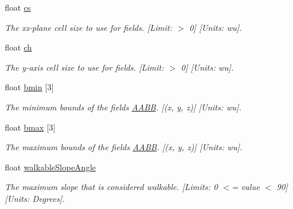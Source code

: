 \begin{DoxyCompactItemize}
\mbox{\label{structrcConfig_a5e970c105687d1083c9e7de2c27a2907}} 
float \hyperlink{structrcConfig_a5e970c105687d1083c9e7de2c27a2907}{cs}
\begin{DoxyCompactList}\small\item\em The xz-\/plane cell size to use for fields. \mbox{[}Limit\+: $>$ 0\mbox{]} \mbox{[}Units\+: wu\mbox{]}. \end{DoxyCompactList}\item 
\mbox{\label{structrcConfig_ac72699d8a02c6a68e4956c3da8274c61}} 
float \hyperlink{structrcConfig_ac72699d8a02c6a68e4956c3da8274c61}{ch}
\begin{DoxyCompactList}\small\item\em The y-\/axis cell size to use for fields. \mbox{[}Limit\+: $>$ 0\mbox{]} \mbox{[}Units\+: wu\mbox{]}. \end{DoxyCompactList}\item 
\mbox{\label{structrcConfig_a117ee510523f94f458878677b1c81750}} 
float \hyperlink{structrcConfig_a117ee510523f94f458878677b1c81750}{bmin} \mbox{[}3\mbox{]}
\begin{DoxyCompactList}\small\item\em The minimum bounds of the field\textquotesingle{}s \hyperlink{classAABB}{A\+A\+BB}. \mbox{[}(x, y, z)\mbox{]} \mbox{[}Units\+: wu\mbox{]}. \end{DoxyCompactList}\item 
\mbox{\label{structrcConfig_a8699c5f903f4a037e94ba4b89f7dc86f}} 
float \hyperlink{structrcConfig_a8699c5f903f4a037e94ba4b89f7dc86f}{bmax} \mbox{[}3\mbox{]}
\begin{DoxyCompactList}\small\item\em The maximum bounds of the field\textquotesingle{}s \hyperlink{classAABB}{A\+A\+BB}. \mbox{[}(x, y, z)\mbox{]} \mbox{[}Units\+: wu\mbox{]}. \end{DoxyCompactList}\item 
\mbox{\label{structrcConfig_ad1ded1b28dab897a37f8a79573f33a21}} 
float \hyperlink{structrcConfig_ad1ded1b28dab897a37f8a79573f33a21}{walkable\+Slope\+Angle}
\begin{DoxyCompactList}\small\item\em The maximum slope that is considered walkable. \mbox{[}Limits\+: 0 $<$= value $<$ 90\mbox{]} \mbox{[}Units\+: Degrees\mbox{]}. \end{DoxyCompactList}\item 

\end{DoxyCompactItemize}
